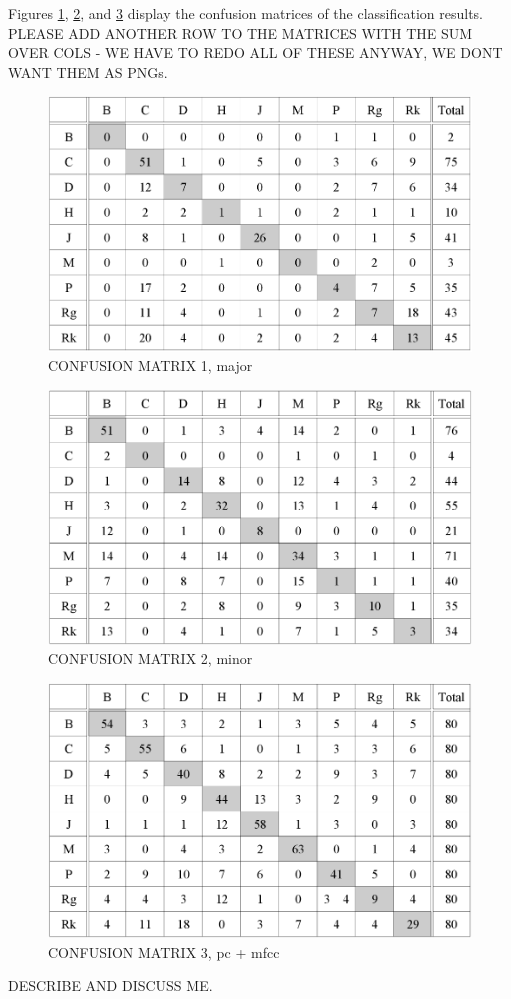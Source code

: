 \documentclass{article}
\begin{document}
Figures \ref{fig:confMatMajPC}, \ref{fig:confMatMinPC}, and \ref{fig:confPC+MFCC} display the confusion matrices of the classification results. PLEASE ADD ANOTHER ROW TO THE MATRICES WITH THE SUM OVER COLS - WE HAVE TO REDO ALL OF THESE ANYWAY, WE DONT WANT THEM AS PNGs.
\begin{figure}[tb]
    \includegraphics[scale=.4]{graph/confMatMajPC}
	\caption{CONFUSION MATRIX 1, major}
	\label{fig:confMatMajPC}
\end{figure}
\begin{figure}[tb]
    \includegraphics[scale=.4]{graph/confMatMinPC}
	\caption{CONFUSION MATRIX 2, minor}
	\label{fig:confMatMinPC}
\end{figure}
\begin{figure}[tb]
    \includegraphics[scale=.4]{graph/confPC+MFCC}
	\caption{CONFUSION MATRIX 3, pc + mfcc}
	\label{fig:confPC+MFCC}
\end{figure}
DESCRIBE AND DISCUSS ME.
\end{document}
